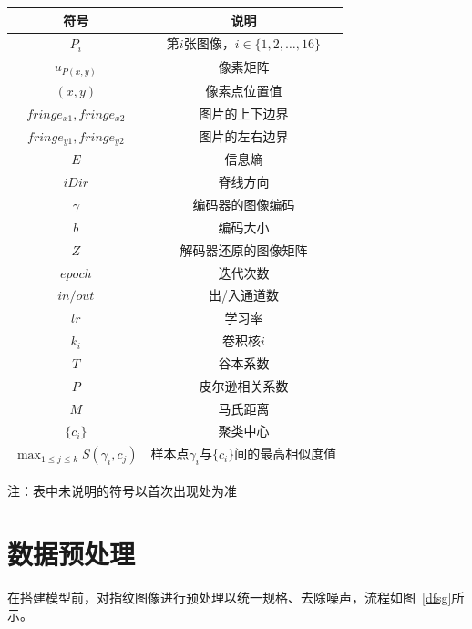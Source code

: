 \documentclass{whutmod}
\begin{document}
        \begin{table}[H]
            \centering
            \setlength{\tabcolsep}{12mm}
            \begin{tabular}{cc}
                \toprule[1.5pt]
                \multicolumn{1}{m{5cm}}{\centering 符号} & \multicolumn{1}{m{5cm}}{\centering 说明} \\
                \midrule[1pt]
                $P_i$ & 第$i$张图像，$i \in \{1, 2, \dots, 16\}$ \\
                $u_{P(x,y)}$ & 像素矩阵 \\
                $(x,y)$ & 像素点位置值 \\
                $fringe_{x1}, fringe_{x2}$ & 图片的上下边界 \\
                $fringe_{y1}, fringe_{y2}$ & 图片的左右边界 \\
                $E$ & 信息熵 \\
                $iDir$ & 脊线方向 \\
                $\gamma$ & 编码器的图像编码 \\
                $b$ & 编码大小 \\
                $Z$ & 解码器还原的图像矩阵 \\
                $epoch$ & 迭代次数 \\
                $in/out$ & 出/入通道数 \\
                $lr$ & 学习率 \\
                $k_i$ & 卷积核$i$ \\
                $T$ & 谷本系数 \\
                $P$ & 皮尔逊相关系数 \\
                $M$ & 马氏距离 \\
                $\{c_i\}$ & 聚类中心 \\
                $\max_{1 \leqslant j \leqslant k} S(\gamma_i, c_j)$ & 样本点$\gamma_i$与$\{c_i\}$间的最高相似度值 \\
                \bottomrule[1.5pt]
            \end{tabular}
            \begin{tablenotes}
                \item 注：表中未说明的符号以首次出现处为准
            \end{tablenotes}
        \end{table}

    \section{数据预处理}
        在搭建模型前，对指纹图像进行预处理以统一规格、去除噪声，流程如图~\ref{dfsg}所示。
\end{document}
